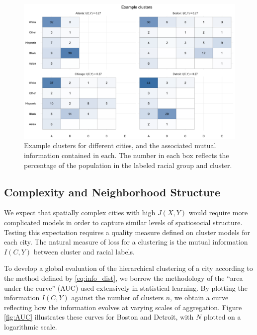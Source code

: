 	\begin{figure}
		\centering
		\includegraphics[width=\textwidth]{figs/example_clusters.png}
		\caption{Example clusters for different cities, and the associated mutual information contained in each. The number in each box reflects the percentage of the population in the labeled racial group and cluster. }
		\label{fig:clusters}
	\end{figure}

\subsection*{Complexity and Neighborhood Structure}

	We expect that spatially complex cities with high $J(X,Y)$ would require more complicated models in order to capture similar levels of spatiosocial structure. Testing this expectation requires a quality measure defined on cluster models for each city. The natural measure of loss for a clustering is the mutual information $I(C,Y)$ between cluster and racial labels.
		
	To develop a global evaluation of the hierarchical clustering of a city according to the method defined by \eqref{eq:info_dist}, we borrow the methodology of the ``area under the curve'' (AUC) used extensively in statistical learning. By plotting the information $I(C,Y)$ against the number of clusters $n$, we obtain a curve reflecting how the information evolves at varying scales of aggregation. Figure \ref{fig:AUC} illustrates these curves for Boston and Detroit, with $N$ plotted on a logarithmic scale.  

